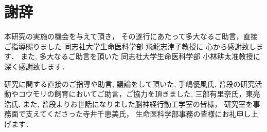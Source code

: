 \documentclass[../main]{subfiles}
\begin{document}
\chapter*{謝辞}

本研究の実施の機会を与えて頂き，
その遂行にあたって多大なるご助言，直接ご指導賜りました
同志社大学生命医科学部 飛龍志津子教授に
心から感謝致します．
また, 多大なるご助言を頂いた
同志社大学生命医科学部 小林耕太准教授に深く感謝致します．

研究に関する直接のご指導や助言, 議論をして頂いた, 手嶋優風氏,
普段の研究活動やコウモリの飼育においてご助言，ご協力を頂きました,
三部有里奈氏，東亮浩氏,
また, 普段よりお世話になりました脳神経行動工学室の皆様，
研究室を事務面で支えてくださった寺井千恵美氏，
生命医科学部事務の皆様にお礼申し上げます．
\end{document}
